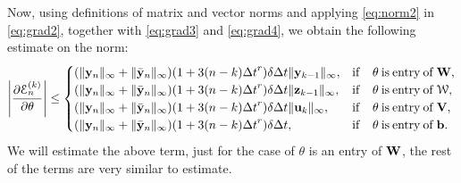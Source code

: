 \documentclass{article} \usepackage{iclr2021_conference,times}
\newcommand{\cW}{\EuScript{W}}
\newcommand{\by}{{\bf y}}
\newcommand{\bz}{{\bf z}}
\newcommand{\bW}{{\bf W}}
\newcommand{\bu}{{\bf u}}
\newcommand{\bb}{{\bf b}}
\newcommand{\bV}{{\bf V}}
\newcommand{\Dt}{{\Delta t}}
\newcommand{\E}{\EuScript{E}}
\begin{document}
Now, using definitions of matrix and vector norms and applying \eqref{eq:norm2} in \eqref{eq:grad2}, together with \eqref{eq:grad3} and \eqref{eq:grad4}, we obtain the following estimate on the norm:
\begin{equation}
\label{eq:norm20}
\left | \frac{\partial \E^{(k)}_n}{\partial \theta} \right | \leq \begin{cases} 
                                     (\|\by_n\|_\infty+\|\bar{\by}_n\|_\infty)(1 + 3(n-k)\Dt^r) \delta \Dt \|\by_{k-1}\|_\infty, &{\rm if} \quad \theta \> {\rm is} \> {\rm entry} \> {\rm of} \> \bW, \\    (\|\by_n\|_\infty+\|\bar{\by}_n\|_\infty)(1 + 3(n-k)\Dt^r) \delta \Dt \|\bz_{k-1}\|_\infty, &{\rm if} \quad \theta \> {\rm is} \> {\rm entry} \> {\rm of} \> {\bf \cW}, \\ (\|\by_n\|_\infty+\|\bar{\by}_n\|_\infty)(1 + 3(n-k)\Dt^r) \delta \Dt \|\bu_k\|_\infty, &{\rm if} \quad \theta \> {\rm is} \> {\rm entry} \> {\rm of} \> \bV, \\    (\|\by_n\|_\infty+\|\bar{\by}_n\|_\infty)(1 + 3(n-k)\Dt^r) \delta \Dt , &{\rm if} \quad \theta \> {\rm is} \> {\rm entry} \> {\rm of} \> \bb. 
                                     \end{cases}
\end{equation}
We will estimate the above term, just for the case of $\theta$ is an entry of $\bW$, the rest of the terms are very similar to estimate. 
\end{document}
